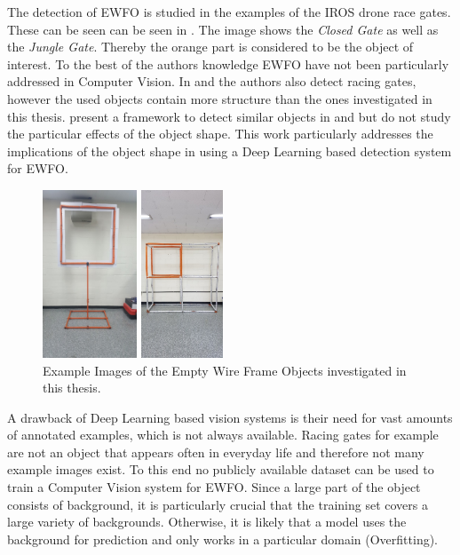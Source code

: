 The detection of \ac{EWFO} is studied in the examples of the \ac{IROS} drone race gates. These can be seen can be seen in . The image shows the \textit{Closed Gate} as well as the \textit{Jungle Gate}. Thereby the orange part is considered to be the object of interest. To the best of the authors knowledge \ac{EWFO} have not been particularly addressed in Computer Vision. In \cite{Falanga} and \cite{Li2018a} the authors also detect racing gates, however the used objects contain more structure than the ones investigated in this thesis. \citeauthor{Jung2018} present a framework to detect similar objects in \cite{Jung} and \cite{Jung2018} but do not study the particular effects of the object shape. This work particularly addresses the implications of the object shape in using a Deep Learning based detection system for \ac{EWFO}.

\begin{figure}[bhtp]
	\centering
	\begin{minipage}{0.45\linewidth}
		\centering
		\includegraphics[height=5cm]{fig/closed_real}
	\end{minipage}\hfill
	\begin{minipage}{0.45\linewidth}
		\centering
		\includegraphics[height=5cm]{fig/jungle_real}
	\end{minipage}
	\caption{Example Images of the Empty Wire Frame Objects investigated in this thesis. }
	\label{fig:gates}
\end{figure}

A drawback of Deep Learning based vision systems is their need for vast amounts of annotated examples, which is not always available. Racing gates for example are not an object that appears often in everyday life and therefore not many example images exist. To this end no publicly available dataset can be used to train a Computer Vision system for \ac{EWFO}. Since a large part of the object consists of background, it is particularly crucial that the training set covers a large variety of backgrounds. Otherwise, it is likely that a model uses the background for prediction and only works in a particular domain (Overfitting). 

